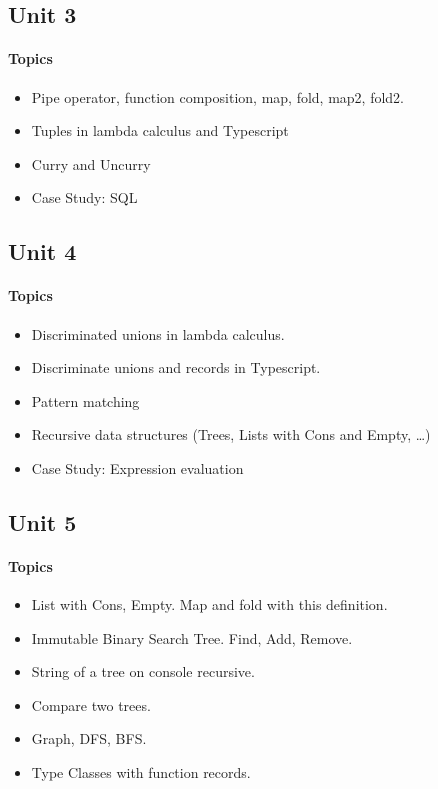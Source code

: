 \subsection*{Unit 3}
\paragraph*{Topics}			
\begin{itemize}[noitemsep]
	\item Pipe operator, function composition, map, fold, map2, fold2.
  \item Tuples in lambda calculus and Typescript
  \item Curry and Uncurry
  \item Case Study: SQL
\end{itemize}

\subsection*{Unit 4}
\paragraph*{Topics}			
\begin{itemize}[noitemsep]
	\item Discriminated unions in lambda calculus.
  \item Discriminate unions and records in Typescript.
  \item Pattern matching
  \item Recursive data structures (Trees, Lists with Cons and Empty, …)
  \item Case Study: Expression evaluation  
\end{itemize}

\subsection*{Unit 5}
\paragraph*{Topics}
\begin{itemize}[noitemsep]
  \item List with Cons, Empty. Map and fold with this definition.
  \item Immutable Binary Search Tree. Find, Add, Remove.
  \item String of a tree on console recursive.
  \item Compare two trees.
  \item Graph, DFS, BFS.
  \item Type Classes with function records. 
\end{itemize}
